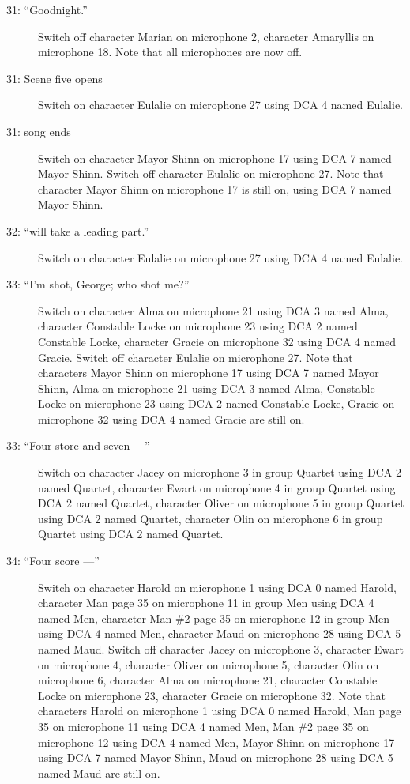 \begin{description}
\item[31: ``Goodnight.'']
Switch off character Marian on microphone 2, character Amaryllis on microphone 18. Note that all microphones are now off.

\item[31: Scene five opens]
Switch on character Eulalie on microphone 27 using DCA 4 named Eulalie. 

\item[31: song ends]
Switch on character Mayor Shinn on microphone 17 using DCA 7 named Mayor Shinn. Switch off character Eulalie on microphone 27. Note that character Mayor Shinn on microphone 17 is still on, using DCA 7 named Mayor Shinn.

\item[32: ``will take a leading part.'']
Switch on character Eulalie on microphone 27 using DCA 4 named Eulalie. 

\item[33: ``I'm shot, George; who shot me?'']
Switch on character Alma on microphone 21 using DCA 3 named Alma, character Constable Locke on microphone 23 using DCA 2 named Constable Locke, character Gracie on microphone 32 using DCA 4 named Gracie. Switch off character Eulalie on microphone 27. Note that characters Mayor Shinn on microphone 17 using DCA 7 named Mayor Shinn, Alma on microphone 21 using DCA 3 named Alma, Constable Locke on microphone 23 using DCA 2 named Constable Locke, Gracie on microphone 32 using DCA 4 named Gracie are still on.  

\item[33: ``Four store and seven ---'']
Switch on character Jacey on microphone 3 in group Quartet using DCA 2 named Quartet, character Ewart on microphone 4 in group Quartet using DCA 2 named Quartet, character Oliver on microphone 5 in group Quartet using DCA 2 named Quartet, character Olin on microphone 6 in group Quartet using DCA 2 named Quartet. 

\item[34: ``Four score ---'']
Switch on character Harold on microphone 1 using DCA 0 named Harold, character Man page 35 on microphone 11 in group Men using DCA 4 named Men, character Man \#2 page 35 on microphone 12 in group Men using DCA 4 named Men, character Maud on microphone 28 using DCA 5 named Maud. Switch off character Jacey on microphone 3, character Ewart on microphone 4, character Oliver on microphone 5, character Olin on microphone 6, character Alma on microphone 21, character Constable Locke on microphone 23, character Gracie on microphone 32. Note that characters Harold on microphone 1 using DCA 0 named Harold, Man page 35 on microphone 11 using DCA 4 named Men, Man \#2 page 35 on microphone 12 using DCA 4 named Men, Mayor Shinn on microphone 17 using DCA 7 named Mayor Shinn, Maud on microphone 28 using DCA 5 named Maud are still on.  


\end{description}

